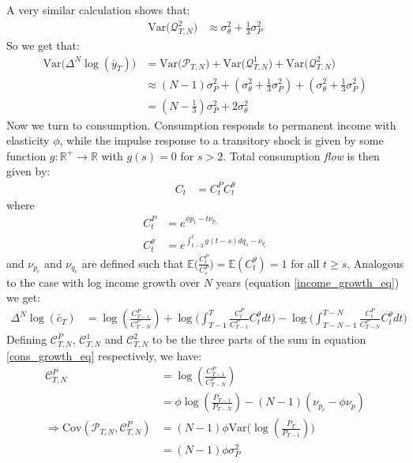 A very similar calculation shows that:
\begin{align*}
\mathrm{Var}\big(\mathcal{Q}^2_{T,N}\big) 
&\approx  \sigma^2_{\theta} +  \frac{1}{3}\sigma^2_P
\end{align*}
So we get that:
\begin{align*}
\mathrm{Var}\Big(\Delta^N\log(\bar{y}_T) \Big)&= \mathrm{Var}\big(\mathcal{P}_{T,N}\big) +\mathrm{Var}\big(\mathcal{Q}^1_{T,N}\big) +\mathrm{Var}\big(\mathcal{Q}^2_{T,N}\big) \\
&\approx (N-1)\sigma^2_P + (\sigma^2_{\theta} +  \frac{1}{3}\sigma^2_P)+(\sigma^2_{\theta} +  \frac{1}{3}\sigma^2_P) \\
&= (N-\frac{1}{3})\sigma^2_P +2\sigma^2_{\theta}
\end{align*}
Now we turn to consumption. Consumption responds to permanent income with elasticity $\phi$, while the impulse response to a transitory shock is given by some function $g:\mathbb{R}^+ \rightarrow \mathbb{R}$ with $g(s)=0$ for $s>2$. Total consumption \textit{flow} is then given by:
\begin{align*}
C_t&= C^{P}_t C^{\theta}_t 
\end{align*}
where
\begin{align*}
C^P_t &= e^{\phi p_t - t\nu_{p_c} }\\
C^{\theta}_t &=	e^{ \int_{t-2}^{t} g(t-s)dq_s -\nu_{q_c}}
\end{align*}
and $\nu_{p_c}$ and $\nu_{q_c}$ are defined such that $\mathbb{E}\Big(\frac{C^P_t}{C^P_s}\Big)=\mathbb{E}(C^{\theta}_t)=1$ for all $t \geq s$. Analogous to the case with log income growth over $N$ years (equation \ref{income_growth_eq}) we get:
\begin{align}
\Delta^N\log(\bar{c}_T) &=   \log(\frac{C^P_{T-1}}{C^P_{T-N}})  + \log \Bigg(  \int_{T-1}^{T} \frac{C^P_t}{C^P_{T-1}}C^{\theta}_t dt\Bigg)  - \log \Bigg(  \int_{T-N-1}^{T-N}  \frac{C^P_t}{C^P_{T-N}} C^{\theta}_t  dt\Bigg) \label{cons_growth_eq}
\end{align}
Defining $\mathcal{C}^P_{T,N}$, $\mathcal{C}^1_{T,N}$ and $\mathcal{C}^2_{T,N}$ to be the three parts of the sum in equation \ref{cons_growth_eq} respectively, we have:
\begin{align*}
\mathcal{C}^P_{T,N} &= \log(\frac{C^P_{T-1}}{C^P_{T-N}}) \\
& = \phi \log(\frac{P_{T-1}}{P_{T-N}}) -(N-1)(\nu_{p_c}-\phi \nu_p) \\
\Rightarrow \mathrm{Cov}(\mathcal{P}_{T,N},\mathcal{C}^P_{T,N}) &= (N-1)\phi \mathrm{Var}\Big(\log(\frac{P_{T}}{P_{T-1}})\Big) \\
&= (N-1)\phi\sigma^2_P
\end{align*}
